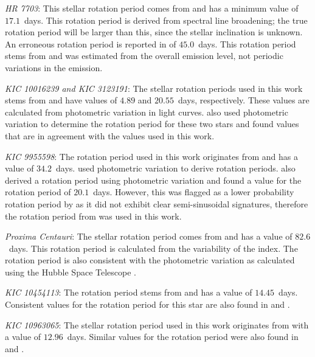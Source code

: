 \textit{HR 7703}: This stellar rotation period comes from \citet{Ammler_vonEiff_Reiners_2012} and has a minimum value of $17.1$~days. This rotation period is derived from spectral line broadening; the true rotation period will be larger than this, since the stellar inclination is unknown. An erroneous rotation period is reported in \citet{Pizzolato_etal_2003} of $45.0$~days. This rotation period stems from \citet{Saar_etal_1997} and was estimated from the overall \caII emission level, not periodic variations in the emission.

\textit{KIC 10016239 and KIC 3123191}: The stellar rotation periods used in this work stems from \citet{McQuillan_etal_2014} and have values of $4.89$ and $20.55$~days, respectively. These values are calculated from photometric variation in light curves. \citet{Garcia_etal_2014} also used photometric variation to determine the rotation period for these two stars and found values that are in agreement with the values used in this work.

\textit{KIC 9955598}: The rotation period used in this work originates from \citet{Garcia_etal_2014} and has a value of $34.2$~days. \citet{Garcia_etal_2014} used photometric variation to derive rotation periods. \citet{Paz_Chinchon_etal_2015} also derived a rotation period using photometric variation and found a value for the rotation period of $20.1$~days. However, this was flagged as a lower probability rotation period by \citet{Paz_Chinchon_etal_2015} as it did not exhibit clear semi-sinusoidal signatures, therefore the rotation period from \citet{Garcia_etal_2014} was used in this work. 

\textit{Proxima Centauri}: The stellar rotation period comes from \citet{Collins_etal_2017} and has a value of $82.6$~days. This rotation period is calculated from the variability of the \Halpha index. The rotation period is also consistent with the photometric variation as calculated using the Hubble Space Telescope \citep{Benedict_etal_1998}.

\textit{KIC 10454113}: The rotation period stems from \citet{McQuillan_etal_2014} and has a value of $14.45$~days. Consistent values for the rotation period for this star are also found in \citet{do_Nascimento_etal_2014} and \citet{Nielsen_etal_2013}.

\textit{KIC 10963065}: The stellar rotation period used in this work originates from \citet{Paz_Chinchon_etal_2015} with a value of $12.96$~days. Similar values for the rotation period were also found in \citet{McQuillan_etal_2013} and \citet{Mazeh_etal_2015}.

